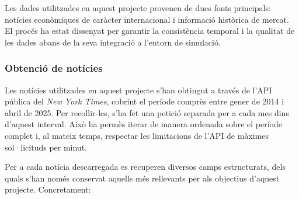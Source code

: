 \documentclass[12pt,a4paper,twoside]{book}
\begin{document}
Les dades utilitzades en aquest projecte provenen de dues fonts principals: notícies econòmiques de caràcter internacional i informació històrica de mercat. El procés ha estat dissenyat per garantir la consistència temporal i la qualitat de les dades abans de la seva integració a l'entorn de simulació.

\subsubsection{Obtenció de notícies}

Les notícies utilitzades en aquest projecte s'han obtingut a través de l'API pública del \textit{New York Times}, cobrint el període comprès entre gener de 2014 i abril de 2025. Per recollir-les, s'ha fet una petició separada per a cada mes dins d'aquest interval. Això ha permès iterar de manera ordenada sobre el període complet i, al mateix temps, respectar les limitacions de l'API de màximes sol·licituds per minut.

Per a cada notícia descarregada es recuperen diversos camps estructurats, dels quals s'han només conservat aquells més rellevants per als objectius d'aquest projecte. Concretament:
\end{document}

